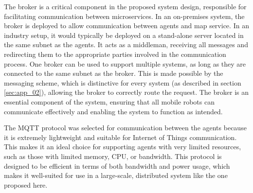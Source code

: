 The broker is a critical component in the proposed system design, responsible for facilitating communication between microservices. In an on-premises system, the broker is deployed to allow communication between agents and map service. In an industry setup, it would typically be deployed on a stand-alone server located in the same subnet as the agents. It acts as a middleman, receiving all messages and redirecting them to the appropriate parties involved in the communication process. One broker can be used to support multiple systems, as long as they are connected to the same subnet as the broker. This is made possible by the messaging scheme, which is distinctive for every system (as described in section \ref{sec:app_02}), allowing the broker to correctly route the request. The broker is an essential component of the system, ensuring that all mobile robots can communicate effectively and enabling the system to function as intended.

The MQTT protocol was selected for communication between the agents because it is extremely lightweight and suitable for Internet of Things communication. This makes it an ideal choice for supporting agents with very limited resources, such as those with limited memory, CPU, or bandwidth. This protocol is designed to be efficient in terms of both bandwidth and power usage, which makes it well-suited for use in a large-scale, distributed system like the one proposed here.